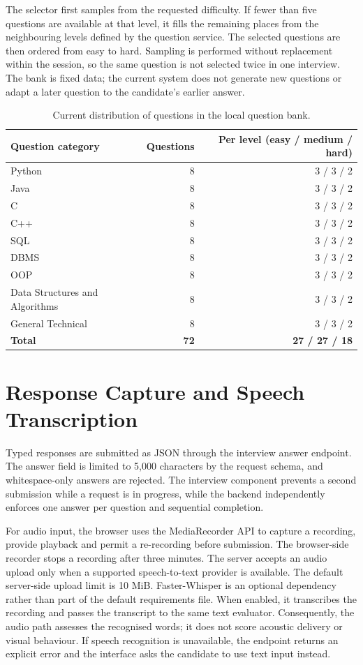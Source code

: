 \documentclass[12pt,a4paper,oneside]{report}
\begin{document}
The selector first samples from the requested difficulty. If fewer than five questions are available at that level, it fills the remaining places from the neighbouring levels defined by the question service. The selected questions are then ordered from easy to hard. Sampling is performed without replacement within the session, so the same question is not selected twice in one interview. The bank is fixed data; the current system does not generate new questions or adapt a later question to the candidate's earlier answer.

\begin{table}[H]
\centering
\small
\begin{tabularx}{0.88\textwidth}{>{\RaggedRight\arraybackslash}X r r}
\toprule
\textbf{Question category} & \textbf{Questions} & \textbf{Per level (easy / medium / hard)} \\
\midrule
Python & 8 & 3 / 3 / 2 \\
Java & 8 & 3 / 3 / 2 \\
C & 8 & 3 / 3 / 2 \\
C++ & 8 & 3 / 3 / 2 \\
SQL & 8 & 3 / 3 / 2 \\
DBMS & 8 & 3 / 3 / 2 \\
OOP & 8 & 3 / 3 / 2 \\
Data Structures and Algorithms & 8 & 3 / 3 / 2 \\
General Technical & 8 & 3 / 3 / 2 \\
\midrule
\textbf{Total} & \textbf{72} & \textbf{27 / 27 / 18} \\
\bottomrule
\end{tabularx}
\caption{Current distribution of questions in the local question bank.}
\label{tab:question-bank}
\end{table}

\section{Response Capture and Speech Transcription}
Typed responses are submitted as JSON through the interview answer endpoint. The answer field is limited to 5,000 characters by the request schema, and whitespace-only answers are rejected. The interview component prevents a second submission while a request is in progress, while the backend independently enforces one answer per question and sequential completion.

For audio input, the browser uses the MediaRecorder API to capture a recording, provide playback and permit a re-recording before submission. The browser-side recorder stops a recording after three minutes. The server accepts an audio upload only when a supported speech-to-text provider is available. The default server-side upload limit is 10 MiB. Faster-Whisper is an optional dependency rather than part of the default requirements file. When enabled, it transcribes the recording and passes the transcript to the same text evaluator. Consequently, the audio path assesses the recognised words; it does not score acoustic delivery or visual behaviour. If speech recognition is unavailable, the endpoint returns an explicit error and the interface asks the candidate to use text input instead.
\end{document}
